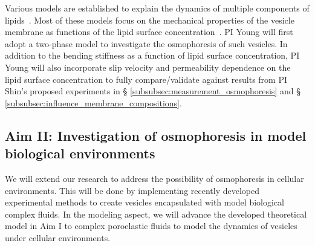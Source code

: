 \documentclass[11pt]{article}
\begin{document}
Various models are established to explain the dynamics of multiple
components of lipids~\cite{Liu2017_SoftMatt}. Most of these models focus
on the mechanical properties of the vesicle membrane as functions of the
lipid surface concentration~\cite{Liu2017_SoftMatt,Baumgart2003_Nature}.
PI Young will first adopt a two-phase model to investigate the
osmophoresis of such vesicles.  In addition to the bending stiffness as
a function of lipid surface concentration, PI Young will also
incorporate slip velocity and permeability dependence on the lipid
surface concentration to fully compare/validate against results from PI
Shin's proposed experiments in \S
\ref{subsubsec:measurement_osmophoresis} and \S
\ref{subsubsec:influence_membrane_compositions}.

\subsection{Aim II: Investigation of osmophoresis in model biological
environments
\label{subsection:aim2_osmophoresis_model_biological_environments}}

We will extend our research to address the possibility of osmophoresis
in cellular environments.  This will be done by implementing recently
developed experimental methods to create vesicles encapsulated with
model biological complex fluids. In the modeling aspect, we will advance
the developed theoretical model in Aim I to complex poroelastic fluids
to model the dynamics of vesicles under cellular environments.

\end{document}
